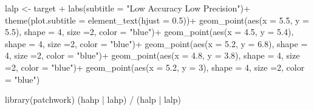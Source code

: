 \documentclass[
  letterpaper,
  DIV=11,
  numbers=noendperiod]{scrreprt}
\newenvironment{Shaded}{\begin{snugshade}}{\end{snugshade}}
\newcommand{\AttributeTok}[1]{\textcolor[rgb]{0.40,0.45,0.13}{#1}}
\newcommand{\DecValTok}[1]{\textcolor[rgb]{0.68,0.00,0.00}{#1}}
\newcommand{\FloatTok}[1]{\textcolor[rgb]{0.68,0.00,0.00}{#1}}
\newcommand{\FunctionTok}[1]{\textcolor[rgb]{0.28,0.35,0.67}{#1}}
\newcommand{\NormalTok}[1]{\textcolor[rgb]{0.00,0.23,0.31}{#1}}
\newcommand{\OtherTok}[1]{\textcolor[rgb]{0.00,0.23,0.31}{#1}}
\newcommand{\SpecialCharTok}[1]{\textcolor[rgb]{0.37,0.37,0.37}{#1}}
\newcommand{\StringTok}[1]{\textcolor[rgb]{0.13,0.47,0.30}{#1}}
\begin{document}
\begin{Shaded}
\begin{Highlighting}[]
\NormalTok{lalp }\OtherTok{\textless{}{-}}\NormalTok{ target }\SpecialCharTok{+}
  \FunctionTok{labs}\NormalTok{(}\AttributeTok{subtitle =} \StringTok{"Low Accuracy Low Precision"}\NormalTok{)}\SpecialCharTok{+}
  \FunctionTok{theme}\NormalTok{(}\AttributeTok{plot.subtitle =} \FunctionTok{element\_text}\NormalTok{(}\AttributeTok{hjust =} \FloatTok{0.5}\NormalTok{))}\SpecialCharTok{+}
  \FunctionTok{geom\_point}\NormalTok{(}\FunctionTok{aes}\NormalTok{(}\AttributeTok{x =} \FloatTok{5.5}\NormalTok{, }\AttributeTok{y =} \FloatTok{5.5}\NormalTok{), }\AttributeTok{shape =} \DecValTok{4}\NormalTok{, }\AttributeTok{size =}\DecValTok{2}\NormalTok{, }\AttributeTok{color =} \StringTok{"blue"}\NormalTok{)}\SpecialCharTok{+}
  \FunctionTok{geom\_point}\NormalTok{(}\FunctionTok{aes}\NormalTok{(}\AttributeTok{x =} \FloatTok{4.5}\NormalTok{, }\AttributeTok{y =} \FloatTok{5.4}\NormalTok{), }\AttributeTok{shape =} \DecValTok{4}\NormalTok{, }\AttributeTok{size =}\DecValTok{2}\NormalTok{, }\AttributeTok{color =} \StringTok{"blue"}\NormalTok{)}\SpecialCharTok{+}
  \FunctionTok{geom\_point}\NormalTok{(}\FunctionTok{aes}\NormalTok{(}\AttributeTok{x =} \FloatTok{5.2}\NormalTok{, }\AttributeTok{y =} \FloatTok{6.8}\NormalTok{), }\AttributeTok{shape =} \DecValTok{4}\NormalTok{, }\AttributeTok{size =}\DecValTok{2}\NormalTok{, }\AttributeTok{color =} \StringTok{"blue"}\NormalTok{)}\SpecialCharTok{+}
  \FunctionTok{geom\_point}\NormalTok{(}\FunctionTok{aes}\NormalTok{(}\AttributeTok{x =} \FloatTok{4.8}\NormalTok{, }\AttributeTok{y =} \FloatTok{3.8}\NormalTok{), }\AttributeTok{shape =} \DecValTok{4}\NormalTok{, }\AttributeTok{size =}\DecValTok{2}\NormalTok{, }\AttributeTok{color =} \StringTok{"blue"}\NormalTok{)}\SpecialCharTok{+}
  \FunctionTok{geom\_point}\NormalTok{(}\FunctionTok{aes}\NormalTok{(}\AttributeTok{x =} \FloatTok{5.2}\NormalTok{, }\AttributeTok{y =} \DecValTok{3}\NormalTok{), }\AttributeTok{shape =} \DecValTok{4}\NormalTok{, }\AttributeTok{size =}\DecValTok{2}\NormalTok{, }\AttributeTok{color =} \StringTok{"blue"}\NormalTok{)}


\FunctionTok{library}\NormalTok{(patchwork)}
\NormalTok{(hahp }\SpecialCharTok{|}\NormalTok{ lahp) }\SpecialCharTok{/}
\NormalTok{(halp }\SpecialCharTok{|}\NormalTok{ lalp)}
\end{Highlighting}
\end{Shaded}
\end{document}
